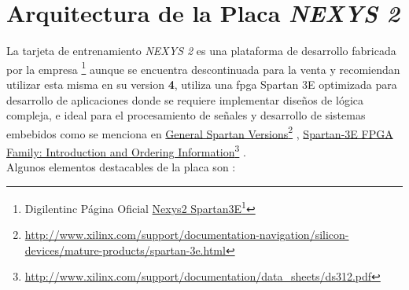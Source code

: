 \documentclass[paper=a4, fontsize=12pt]{article} 		%
\newcommand\fnurl[2]{%
\href{#2}{#1}\footnote{\url{#2}}%
}
\numberwithin{equation}{section}						%
\numberwithin{table}{section} 							%
\begin{document}
\section{Arquitectura de la Placa \emph{NEXYS 2}}
La tarjeta de entrenamiento \emph{NEXYS 2} es una plataforma de desarrollo fabricada por la empresa \footnote{Digilentinc Página Oficial \fnurl{Nexys2 Spartan3E}{http://store.digilentinc.com/nexys-2-spartan-3e-fpga-trainer-board-retired-see-nexys-4-ddr/}} aunque se encuentra descontinuada para la venta y recomiendan utilizar esta misma en su version \textbf{4}, utiliza una fpga Spartan 3E optimizada para desarrollo de aplicaciones donde se requiere implementar diseños de lógica compleja, e ideal para el procesamiento de señales y desarrollo de sistemas embebidos como se menciona en \fnurl{General Spartan Versions}{http://www.xilinx.com/support/documentation-navigation/silicon-devices/mature-products/spartan-3e.html}, \fnurl{Spartan-3E FPGA Family: Introduction and Ordering Information}{http://www.xilinx.com/support/documentation/data_sheets/ds312.pdf}.
\\Algunos elementos destacables de la placa son :
\end{document}
